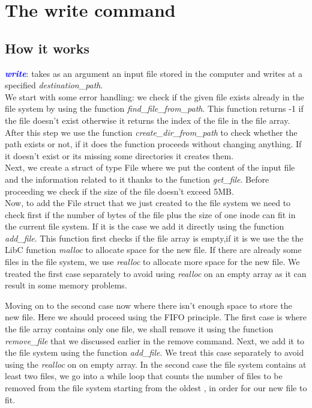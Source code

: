 \section{The write command}

\subsection{How it works}
\textit{\textcolor{blue}{\textbf{write}}}: takes as an argument an input file stored in the computer and writes at a specified \textit{destination\_path}.\\

We start with some error handling: we check if the given file exists already in the file system by using the function \textit{find\_file\_from\_path}. This function returns -1 if the file doesn't exist otherwise it returns the index of the file in the file array.\\

After this step we use the function \textit{create\_dir\_from\_path} to check whether the path exists or not, if it does the function proceeds without changing anything. If it doesn't exist or its missing some directories it creates them. \\

Next, we create a struct of type File where we put the content of the input file and the information related to it thanks to the function \textit{get\_file}. Before proceeding we check if the size of the file doesn't exceed 5MB.\\

Now, to add the File struct that we just created to the file system we need to check first if the number of bytes of the file plus the size of one inode can fit in the current file system. If it is the case we add it directly using the function \textit{add\_file}. This function first checks if the file array is empty,if it is we use the the LibC function \textit{malloc} to allocate space for the new file. If there are already some files in the file system, we use \textit{realloc} to allocate more space for the new file. We treated the first case separately to avoid using \textit{realloc} on an empty array as it can result in some memory problems. \\
\newpage

Moving on to the second case now where there isn't enough space to store the new file. Here we should proceed using the FIFO principle.
The first case is where the file array contains only one file, we shall remove it using the function \textit{remove\_file} that we discussed earlier in the remove command. Next, we add it to the file system using  the function \textit{add\_file}. We treat this case separately to avoid using the \textit{realloc} on on empty array. In the second case the file system contains at least two files, we go into a while loop that counts the number of files to be removed from the file system starting from the oldest , in order for our new file to fit.\\

